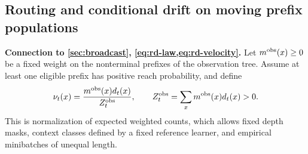 \subsection{Routing and conditional drift on moving prefix populations}
\label{app:rd-flow}
\textbf{Connection to \cref{sec:broadcast}, \cref{eq:rd-law,eq:rd-velocity}.} Let $m^{\rm obs}(x)\ge0$ be a fixed weight on the nonterminal prefixes of the observation tree. Assume at least one eligible prefix has positive reach probability, and define
\begin{equation}
 \nu_t(x)=\frac{m^{\rm obs}(x)d_t(x)}{Z_t^{\rm obs}},\qquad
 Z_t^{\rm obs}=\sum_xm^{\rm obs}(x)d_t(x)>0.
 \label{eq:rd-observation}
\end{equation}
This is normalization of expected weighted counts, which allows fixed depth masks, context classes defined by a fixed reference learner, and empirical minibatches of unequal length.

